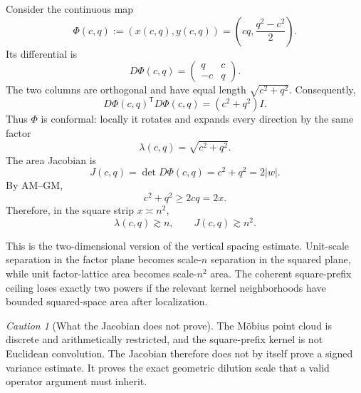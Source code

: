 \documentclass[11pt]{article}
\theoremstyle{definition}
\theoremstyle{remark}
\newtheorem{caution}[theorem]{Caution}
\newcommand{\1}{\mathbf{1}}
\begin{document}
Consider the continuous map
\begin{equation}
 \Phi(c,q)
 :=
 \left(
 x(c,q),y(c,q)
 \right)
 =
 \left(
 cq,\frac{q^2-c^2}{2}
 \right).
 \label{eq:Phi}
\end{equation}
Its differential is
\begin{equation}
 D\Phi(c,q)
 =
 \begin{pmatrix}
 q & c\\
 -c & q
 \end{pmatrix}.
 \label{eq:D-Phi}
\end{equation}
The two columns are orthogonal and have equal length $\sqrt{c^2+q^2}$.  Consequently,
\begin{equation}
 D\Phi(c,q)^{\mathsf T}D\Phi(c,q)
 =(c^2+q^2)I.
 \label{eq:conformal-metric}
\end{equation}
Thus $\Phi$ is conformal: locally it rotates and expands every direction by the same factor
\begin{equation}
 \lambda(c,q)=\sqrt{c^2+q^2}.
 \label{eq:length-scale}
\end{equation}
The area Jacobian is
\begin{equation}
 \boxed{
 J(c,q)=\det D\Phi(c,q)=c^2+q^2=2|w|.
 }
 \label{eq:Jacobian}
\end{equation}
By AM--GM,
\begin{equation}
 c^2+q^2\ge2cq=2x.
 \label{eq:Jacobian-lower}
\end{equation}
Therefore, in the square strip $x\asymp n^2$,
\begin{equation}
 \lambda(c,q)\gtrsim n,
 \qquad
 J(c,q)\gtrsim n^2.
 \label{eq:square-scale-expansion}
\end{equation}

This is the two-dimensional version of the vertical spacing estimate.  Unit-scale separation in the factor plane becomes scale-$n$ separation in the squared plane, while unit factor-lattice area becomes scale-$n^2$ area.  The coherent square-prefix ceiling loses exactly two powers if the relevant kernel neighborhoods have bounded squared-space area after localization.

\begin{caution}[What the Jacobian does not prove]
The M\"obius point cloud is discrete and arithmetically restricted, and the square-prefix kernel is not Euclidean convolution.  The Jacobian therefore does not by itself prove a signed variance estimate.  It proves the exact geometric dilution scale that a valid operator argument must inherit.
\end{caution}
\end{document}
